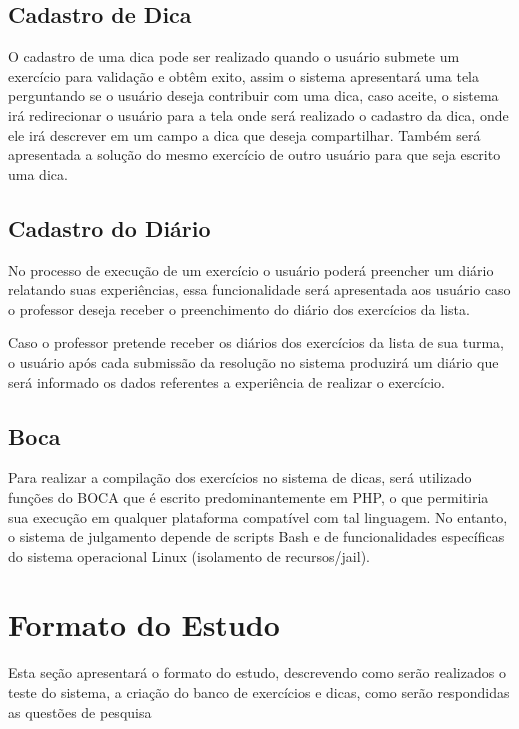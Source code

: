\subsection{Cadastro de Dica}

O cadastro de uma dica pode ser realizado quando o usuário submete um exercício para validação e obtêm exito, assim o sistema apresentará uma tela perguntando se o usuário deseja contribuir com uma dica, caso aceite, o sistema irá redirecionar o usuário para a tela onde será realizado o cadastro da dica, onde ele irá descrever em um campo a dica que deseja compartilhar. Também será apresentada a solução do mesmo exercício de outro usuário para que seja escrito uma dica. 

\subsection{Cadastro do Diário}

No processo de execução de um exercício o usuário poderá preencher um diário relatando suas experiências, essa funcionalidade será apresentada aos usuário caso o professor deseja receber o preenchimento do diário dos exercícios da lista. 

Caso o professor pretende receber os diários dos exercícios da lista de sua turma, o usuário após cada submissão da resolução no sistema produzirá um diário que será informado os dados referentes a experiência de realizar o exercício. 

\subsection{Boca}

Para realizar a compilação dos exercícios no sistema de dicas, será utilizado funções do  BOCA que é escrito predominantemente em PHP, o que permitiria sua execução em qualquer plataforma compatível com tal linguagem. No entanto, o sistema de julgamento depende de scripts Bash e de funcionalidades específicas do sistema operacional Linux (isolamento de recursos/jail). 

\section{Formato do Estudo}

Esta seção apresentará o formato do estudo, descrevendo como serão realizados o teste do sistema, a criação do banco de exercícios e dicas, como serão respondidas as questões de pesquisa


